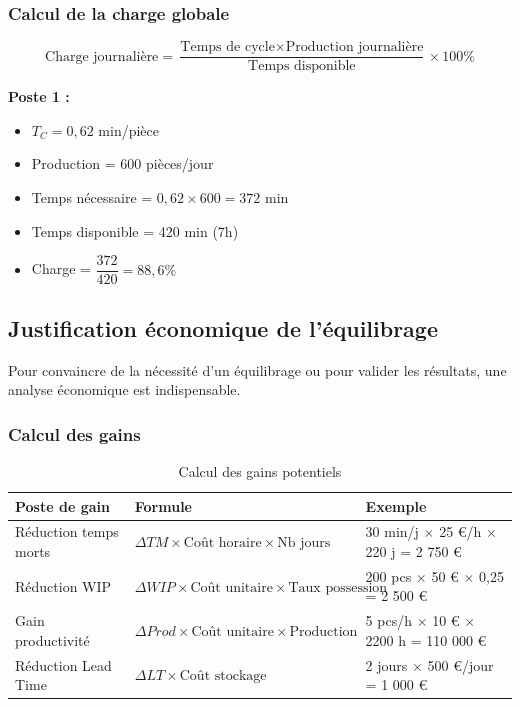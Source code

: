 \documentclass[12pt,a4paper]{article}
\newenvironment{methodbox}[1]
  {\begin{tcolorbox}[colback=blue!5!white, colframe=methodcolor, title=#1]\small}
  {\end{tcolorbox}}
\begin{document}
\subsubsection{Calcul de la charge globale}

\[
\boxed{\text{Charge journalière} = \frac{\text{Temps de cycle} \times \text{Production journalière}}{\text{Temps disponible}} \times 100\%}
\]

\begin{methodbox}{Exemple de calcul de charge}
\textbf{Poste 1 :}
\begin{itemize}
    \item $T_C = 0,62$ min/pièce
    \item Production = 600 pièces/jour
    \item Temps nécessaire = $0,62 \times 600 = 372$ min
    \item Temps disponible = 420 min (7h)
    \item Charge = $\dfrac{372}{420} = 88,6\%$
\end{itemize}
\end{methodbox}

\subsection{Justification économique de l'équilibrage}

Pour convaincre de la nécessité d'un équilibrage ou pour valider les résultats, une analyse économique est indispensable.

\subsubsection{Calcul des gains}

\begin{table}[H]
\centering
\begin{tabular}{|p{5cm}|p{4cm}|p{4cm}|}
\hline
\textbf{Poste de gain} & \textbf{Formule} & \textbf{Exemple} \\
\hline
Réduction temps morts & $\Delta TM \times \text{Coût horaire} \times \text{Nb jours}$ & 30 min/j $\times$ 25 €/h $\times$ 220 j = 2 750 € \\
\hline
Réduction WIP & $\Delta WIP \times \text{Coût unitaire} \times \text{Taux possession}$ & 200 pcs $\times$ 50 € $\times$ 0,25 = 2 500 € \\
\hline
Gain productivité & $\Delta Prod \times \text{Coût unitaire} \times \text{Production}$ & 5 pcs/h $\times$ 10 € $\times$ 2200 h = 110 000 € \\
\hline
Réduction Lead Time & $\Delta LT \times \text{Coût stockage}$ & 2 jours $\times$ 500 €/jour = 1 000 € \\
\hline
\end{tabular}
\caption{Calcul des gains potentiels}
\end{table}
\end{document}
